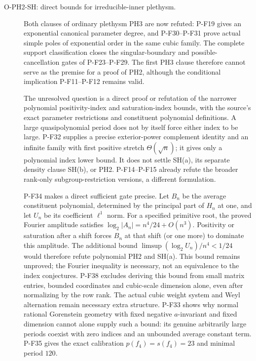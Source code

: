 \documentclass[11pt,a4paper]{article}
\begin{document}
\begin{description}
\item[O-PH2-SH: direct bounds for irreducible-inner plethysm.]
Both clauses of ordinary plethysm PH3 are now refuted: P-F19 gives
an exponential canonical parameter degree, and P-F30--P-F31 prove
actual simple poles of exponential order in the same cubic family.
The complete support classification closes the singular-boundary
and possible-cancellation gates of P-F23--P-F29. The first PH3
clause therefore cannot serve as the premise for a proof of PH2,
although the conditional implication P-F11--P-F12 remains valid.

The unresolved question is a direct proof or refutation of the
narrower polynomial positivity-index and saturation-index bounds,
with the source's exact parameter restrictions and constituent
polynomial definitions. A large quasipolynomial period does not by
itself force either index to be large. P-F32 supplies a precise
exterior-power complement identity and an infinite family with
first positive stretch $\Theta(\sqrt n)$; it gives only a polynomial
index lower bound. It does not settle SH(a), its separate density
clause SH(b), or PH2. P-F14--P-F15 already refute the broader
rank-only subgroup-restriction versions, a different formulation.

P-F34 makes a direct sufficient gate precise. Let $B_n$ be the
average constituent polynomial, determined by the principal part
of $H_n$ at one, and let $U_n$ be its coefficient $\ell^1$ norm.
For a specified primitive root, the proved Fourier amplitude satisfies
$\log_2|A_n|=n^4/24+O(n^3)$. Positivity or saturation
after a shift forces $B_n$ at that shift (or one more) to dominate
this amplitude. The additional bound
$\limsup (\log_2 U_n)/n^4<1/24$ would therefore refute polynomial
PH2 and SH(a). This bound remains unproved; the Fourier inequality
is necessary, not an equivalence to the index conjectures.
P-F38 excludes deriving this bound from small matrix entries, bounded
coordinates and cubic-scale dimension alone, even after normalizing by
the row rank. The actual cubic weight system and Weyl alternation remain
necessary extra structure. P-F33 shows why normal rational Gorenstein geometry with fixed
negative $a$-invariant and fixed dimension cannot alone supply
such a bound: its genuine arbitrarily large periods coexist with
zero indices and an unbounded average constant term. P-F35 gives
the exact calibration $p(f_4)=s(f_4)=23$ and minimal period $120$.


\end{description}
\end{document}
